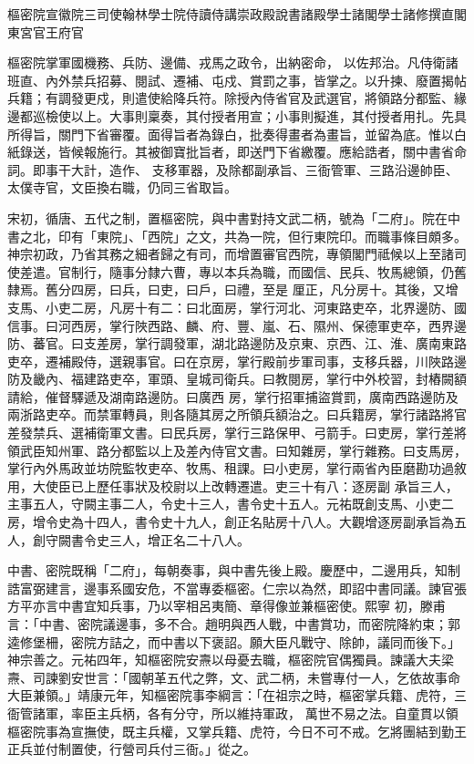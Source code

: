 
\begin{pinyinscope}

 樞密院宣徽院三司使翰林學士院侍讀侍講崇政殿說書諸殿學士諸閣學士諸修撰直閣東宮官王府官



 樞密院掌軍國機務、兵防、邊備、戎馬之政令，出納密命，
 以佐邦治。凡侍衛諸班直、內外禁兵招募、閱試、遷補、屯戍、賞罰之事，皆掌之。以升揀、廢置揭帖兵籍；有調發更戍，則遣使給降兵符。除授內侍省官及武選官，將領路分都監、緣邊都巡檢使以上。大事則稟奏，其付授者用宣；小事則擬進，其付授者用扎。先具所得旨，關門下省審覆。面得旨者為錄白，批奏得畫者為畫旨，並留為底。惟以白紙錄送，皆候報施行。其被御寶批旨者，即送門下省繳覆。應給誥者，關中書省命詞。即事干大計，造作、
 支移軍器，及除都副承旨、三衙管軍、三路沿邊帥臣、太僕寺官，文臣換右職，仍同三省取旨。



 宋初，循唐、五代之制，置樞密院，與中書對持文武二柄，號為「二府」。院在中書之北，印有「東院」、「西院」之文，共為一院，但行東院印。而職事條目頗多。神宗初政，乃省其務之細者歸之有司，而增置審官西院，專領閣門祗候以上至諸司使差遣。官制行，隨事分隸六曹，專以本兵為職，而國信、民兵、牧馬總領，仍舊隸焉。舊分四房，曰兵，曰吏，曰戶，曰禮，至是
 厘正，凡分房十。其後，又增支馬、小吏二房，凡房十有二：曰北面房，掌行河北、河東路吏卒，北界邊防、國信事。曰河西房，掌行陜西路、麟、府、豐、嵐、石、隰州、保德軍吏卒，西界邊防、蕃官。曰支差房，掌行調發軍，湖北路邊防及京東、京西、江、淮、廣南東路吏卒，遷補殿侍，選親事官。曰在京房，掌行殿前步軍司事，支移兵器，川陜路邊防及畿內、福建路吏卒，軍頭、皇城司衛兵。曰教閱房，掌行中外校習，封樁闕額請給，催督驛遞及湖南路邊防。曰廣西
 房，掌行招軍捕盜賞罰，廣南西路邊防及兩浙路吏卒。而禁軍轉員，則各隨其房之所領兵額治之。曰兵籍房，掌行諸路將官差發禁兵、選補衛軍文書。曰民兵房，掌行三路保甲、弓箭手。曰吏房，掌行差將領武臣知州軍、路分都監以上及差內侍官文書。曰知雜房，掌行雜務。曰支馬房，掌行內外馬政並坊院監牧吏卒、牧馬、租課。曰小吏房，掌行兩省內臣磨勘功過敘用，大使臣已上歷任事狀及校尉以上改轉遷遣。吏三十有八：逐房副
 承旨三人，主事五人，守闕主事二人，令史十三人，書令史十五人。元祐既創支馬、小吏二房，增令史為十四人，書令史十九人，創正名貼房十八人。大觀增逐房副承旨為五人，創守闕書令史三人，增正名二十八人。



 中書、密院既稱「二府」，每朝奏事，與中書先後上殿。慶歷中，二邊用兵，知制誥富弼建言，邊事系國安危，不當專委樞密。仁宗以為然，即詔中書同議。諫官張方平亦言中書宜知兵事，乃以宰相呂夷簡、章得像並兼樞密使。熙寧
 初，滕甫言：「中書、密院議邊事，多不合。趙明與西人戰，中書賞功，而密院降約束；郭逵修堡柵，密院方詰之，而中書以下褒詔。願大臣凡戰守、除帥，議同而後下。」神宗善之。元祐四年，知樞密院安燾以母憂去職，樞密院官偶獨員。諫議大夫梁燾、司諫劉安世言：「國朝革五代之弊，文、武二柄，未嘗專付一人，乞依故事命大臣兼領。」靖康元年，知樞密院事李綱言：「在祖宗之時，樞密掌兵籍、虎符，三衙管諸軍，率臣主兵柄，各有分守，所以維持軍政，
 萬世不易之法。自童貫以領樞密院事為宣撫使，既主兵權，又掌兵籍、虎符，今日不可不戒。乞將團結到勤王正兵並付制置使，行營司兵付三衙。」從之。




\end{pinyinscope}
